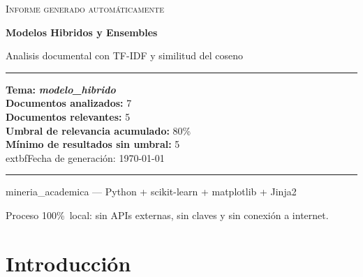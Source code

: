 \documentclass[11pt,a4paper]{article}
\newcommand{\tema}[1]{\textbf{\textit{#1}}}
\newcommand{\pcento}{\%}
\begin{document}
\begin{titlepage}
  \centering
  \vspace*{2.0cm}

  {\Large\textsc{Informe generado automáticamente}\par}
  \vspace{0.7cm}
  {\huge\bfseries Modelos Hibridos y Ensembles\par}
  \vspace{0.4cm}
  {\large Analisis documental con TF-IDF y similitud del coseno\par}

  \vspace{1.8cm}

  \begin{minipage}{0.92\textwidth}
    \hrule
    \vspace{0.4cm}
    {\small
    \textbf{Tema:} \tema{ modelo\_hibrido }\\[4pt]
    \textbf{Documentos analizados:} 7\\
    \textbf{Documentos relevantes:} 5\\
    \textbf{Umbral de relevancia acumulado:} 80\pcento\\
    \textbf{Mínimo de resultados sin umbral:} 5\\
      	extbf{Fecha de generación:} \today
    \par}
    \vspace{0.4cm}
    \hrule
  \end{minipage}

  \vfill

  {\small mineria\_academica --- Python + scikit-learn + matplotlib + Jinja2\par}
  {\footnotesize
   Proceso 100\pcento\ local: sin APIs externas, sin claves y sin conexión
   a internet.\par}
\end{titlepage}

\tableofcontents
\newpage

\section{Introducción}
\label{sec:introduccion}
\end{document}
